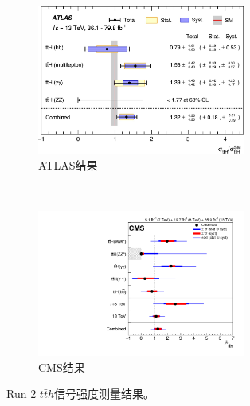 \begin{figure}[h]
\centering
\begin{subfigure}[b]{0.95\textwidth}
\centering
 \includegraphics[width=0.75\textwidth]{fig/ATLAS_ttH_mu_80fb.jpg}
 \caption{ATLAS结果\cite{Aaboud:2018urx}}\label{subfig:ATLAS_tth_mu_80fb}
\end{subfigure}\\
\begin{subfigure}[b]{0.95\textwidth}
\centering
 \includegraphics[width=0.75\textwidth]{fig/CMS_ttH_mu_80fb.png}
 \caption{CMS结果\cite{PhysRevLett.120.231801}}\label{subfig:CMS_tth_mu_80fb}
\end{subfigure}
 \caption{Run 2 $t\bar{t}h$信号强度测量结果。}
 \label{fig:HiggsPromu_ATALS_CMS}
\end{figure}

